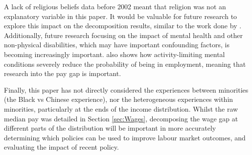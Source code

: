 \documentclass[class=article, crop=false]{standalone}
\begin{document}
A lack of religious beliefs data before 2002 meant that religion was not an explanatory variable in this paper. It would be valuable for future research to explore this impact on the decomposition results, similar to the work done by \citet{Longhi}. Additionally, future research focusing on the impact of mental health and other non-physical disabilities, which may have important confounding factors, is becoming increasingly important. \citep{Longhi} also shows how activity-limiting mental conditions severely reduce the probability of being in employment, meaning that research into the pay gap is important.

Finally, this paper has not directly considered the experiences between minorities (the Black vs Chinese experience), nor the heterogeneous experiences within minorities, particularly at the ends of the income distribution. Whilst the raw median pay was detailed in Section \ref{sec:Wages}, decomposing the wage gap at different parts of the distribution will be important in more accurately determining which policies can be used to improve labour market outcomes, and evaluating the impact of recent policy.

\ifstandalone

\fi
\end{document}
